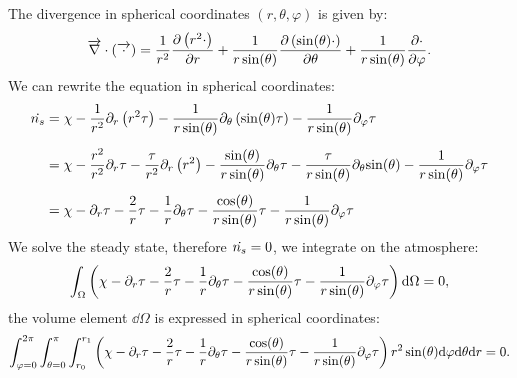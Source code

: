 The divergence in spherical coordinates $(r, \theta, \varphi)$ is given by:
\begin{equation}
\overrightarrow{\nabla}\cdot(\overrightarrow{\cdot}) = \frac{1}{r^2}\frac{\partial\left(r^2\cdot\right)}{\partial r} + 
                  \frac{1}{r\sin(\theta)}\frac{\partial\left(\sin(\theta)\cdot\right)}{\partial\theta} +
                  \frac{1}{r\sin(\theta)}\frac{\partial\cdot}{\partial\varphi}.
\end{equation}
%
We can rewrite the equation in spherical coordinates:
\begin{equation}
\begin{split}
\dot{n_s} & = \chi -  \frac{1}{r^2}\partial_{r}\left({r^2\tau}\right) - 
                          \frac{1}{r\sin(\theta)}\partial_{\theta}\left({\sin(\theta)\tau}\right) -
                          \frac{1}{r\sin(\theta)}\partial_{\varphi}{\tau} \\[5pt]
              & = \chi - \frac{r^2}{r^2}\partial_{r}{\tau} - \frac{\tau}{r^2}\partial_{r}\left({r^2}\right) -
                         \frac{\sin(\theta)}{r\sin(\theta)}\partial_{\theta}{\tau} -
                         \frac{\tau}{r\sin(\theta)}\partial_{\theta}{\sin(\theta)} -
                         \frac{1}{r\sin(\theta)}\partial_{\varphi}{\tau} \\[5pt]
              & = \chi - \partial_{r}{\tau} - \frac{2}{r}\tau -
                         \frac{1}{r}\partial_{\theta}{\tau} -
                         \frac{\cos(\theta)}{r\sin(\theta)}\tau -
                         \frac{1}{r\sin(\theta)}\partial_{\varphi}{\tau}
\end{split}
\end{equation}
%
We solve the steady state, therefore $\dot{n_s}=0$, we integrate on the atmosphere:
\begin{equation}
\int_\Omega \left( \chi - \partial_{r}{\tau} - \frac{2}{r}\tau -
                         \frac{1}{r}\partial_{\theta}{\tau} -
                         \frac{\cos(\theta)}{r\sin(\theta)}\tau -
                         \frac{1}{r\sin(\theta)}\partial_{\varphi}{\tau} \right) \mathrm{d}\Omega
 = 0,
\end{equation}
the volume element $\dd\Omega$ is expressed in spherical coordinates:
\begin{equation}
\int_{\varphi = 0}^{2\pi}\int_{\theta = 0}^{\pi}\int_{r_0}^{r_1}
\left( \chi - \partial_{r}{\tau} - \frac{2}{r}\tau -
                         \frac{1}{r}\partial_{\theta}{\tau} -
                         \frac{\cos(\theta)}{r\sin(\theta)}\tau -
                         \frac{1}{r\sin(\theta)}\partial_{\varphi}{\tau} \right) 
r^2\sin(\theta)\mathrm{d}\varphi\mathrm{d}\theta\mathrm{d} r
= 0.
\end{equation}
